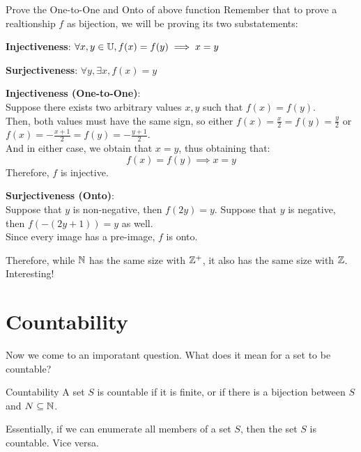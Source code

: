 \begin{ln-quest}{Prove the One-to-One and Onto of above function}{}
    Remember that to prove a realtionship $f$ as bijection, we will be proving its two substatements:
    \begin{bindenum}
        \item \textbf{Injectiveness}: $\forall x, y \in \mathbb{U}, f(x) = f(y) \implies x = y$
        \item \textbf{Surjectiveness}: $\forall y, \exists x, f(x) = y$
    \end{bindenum}

    \textbf{Injectiveness (One-to-One)}: \\
    Suppose there exists two arbitrary values $x, y$ such that $f(x) = f(y)$. \\
    Then, both values must have the same sign, so either $f(x) = \frac{x}{2} = f(y) = \frac{y}{2}$ or $f(x) = -\frac{x + 1}{2} = f(y) = -\frac{y + 1}{2}$. \\
    And in either case, we obtain that $x = y$, thus obtaining that:
    \[f(x) = f(y) \implies x = y\]
    Therefore, $f$ is injective.
    
    \textbf{Surjectiveness (Onto)}: \\
    Suppose that $y$ is non-negative, then $f(2y) = y$. Suppose that $y$ is negative, then $f(-(2y + 1)) = y$ as well. \\
    Since every image has a pre-image, $f$ is onto.
\end{ln-quest}

Therefore, while $\mathbb{N}$ has the same size with $\mathbb{Z}^+$, it also has the same size with $\mathbb{Z}$. Interesting!

\section{Countability}
Now we come to an imporatant question. What does it mean for a set to be countable? 
\begin{ln-define}{Countability}{}
    A set $S$ is countable if it is finite, or if there is a bijection between $S$ and $N \subseteq \mathbb{N}$.
\end{ln-define}
Essentially, if we can enumerate all members of a set $S$, then the set $S$ is countable. Vice versa.


